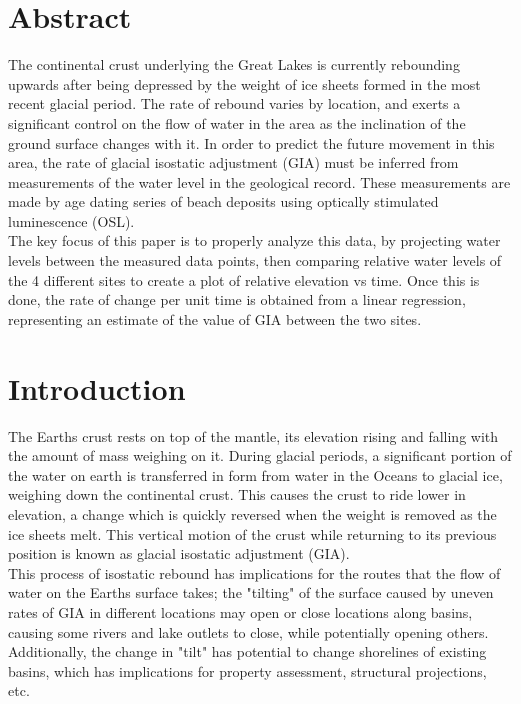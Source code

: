 \documentclass{article}
\begin{document}


\section{Abstract}
The continental crust underlying the Great Lakes is currently rebounding upwards
 after being depressed by the weight of ice sheets formed in the most recent glacial period.
 The rate of rebound varies by location, and exerts a significant control on the flow of water
 in the area as the inclination of the ground surface changes with it. In order to predict the
 future movement in this area, the rate of glacial isostatic adjustment (GIA) must be
 inferred from measurements of the water level in the geological record. These measurements are
 made by age dating series of beach deposits using optically stimulated luminescence (OSL).\\
 
 The key focus of this paper is to properly analyze this data, by projecting water levels
 between the measured data points, then comparing relative water levels of the 4 different sites
 to create a plot of relative elevation vs time. Once this is done, the rate of change per unit
 time is obtained from a linear regression, representing an estimate of the value of GIA between
 the two sites.
\newpage

\section{Introduction}
 The Earths crust rests on top of the mantle, its elevation rising and falling
 with the amount of mass weighing on it. During glacial periods, a significant portion
 of the water on earth is transferred in form from water in the Oceans to glacial ice,
 weighing down the continental crust. This causes the crust to ride lower in elevation,
 a change which is quickly reversed when the weight is removed as the ice sheets melt.
 This vertical motion of the crust while returning to its previous position is known
 as glacial isostatic adjustment (GIA).\\
 
 This process of isostatic rebound has implications for the routes that the flow
 of water on the Earths surface takes; the "tilting" of the surface caused by 
 uneven rates of GIA in different locations may open or close locations along basins,
 causing some rivers and lake outlets to close, while potentially opening others.
 Additionally, the change in "tilt" has potential to change shorelines of existing
 basins, which has implications for property assessment, structural projections, etc.\\
 
\end{document}
